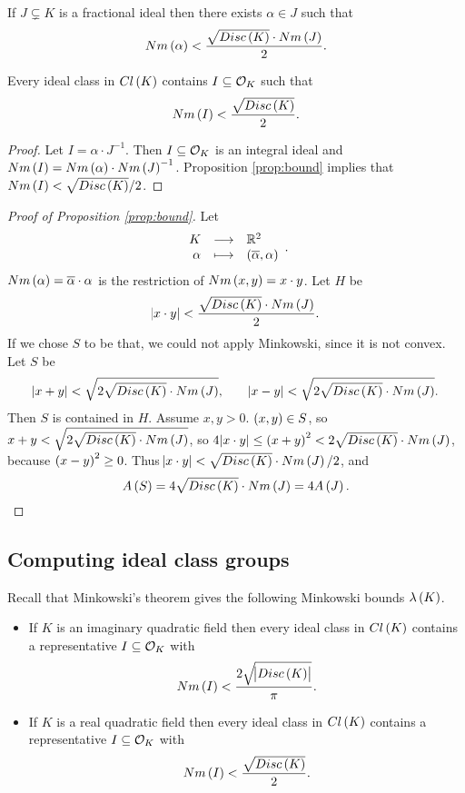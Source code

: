\begin{proposition}
\label{prop:bound}
If $ J \subsetneq K $ is a fractional ideal then there exists $ \alpha \in J $ such that
$$ Nm\br{\alpha} < \dfrac{\sqrt{Disc\br{K}} \cdot Nm\br{J}}{2}. $$
\end{proposition}

\begin{corollary}
Every ideal class in $ Cl\br{K} $ contains $ I \subseteq \mathcal{O}_K $ such that
$$ Nm\br{I} < \dfrac{\sqrt{Disc\br{K}}}{2}. $$
\end{corollary}

\begin{proof}
Let $ I = \alpha \cdot J^{-1} $. Then $ I \subseteq \mathcal{O}_K $ is an integral ideal and $ Nm\br{I} = Nm\br{\alpha} \cdot Nm\br{J}^{-1} $. Proposition \ref{prop:bound} implies that $ Nm\br{I} < \sqrt{Disc\br{K}} / 2 $.
\end{proof}

\begin{proof}[Proof of Proposition \ref{prop:bound}]
Let
$$ \function{K}{\R^2}{\alpha}{\br{\overline{\alpha}, \alpha}}. $$
$ Nm\br{\alpha} = \overline{\alpha} \cdot \alpha $ is the restriction of $ Nm\br{x, y} = x \cdot y $. Let $ H $ be
$$ \abs{x \cdot y} < \dfrac{\sqrt{Disc\br{K}} \cdot Nm\br{J}}{2}. $$
If we chose $ S $ to be that, we could not apply Minkowski, since it is not convex. Let $ S $ be
$$ \abs{x + y} < \sqrt{2\sqrt{Disc\br{K}} \cdot Nm\br{J}}, \qquad \abs{x - y} < \sqrt{2\sqrt{Disc\br{K}} \cdot Nm\br{J}}. $$
Then $ S $ is contained in $ H $. Assume $ x, y > 0 $. $ \br{x, y} \in S $, so $ x + y < \sqrt{2\sqrt{Disc\br{K}} \cdot Nm\br{J}} $, so $ 4\abs{x \cdot y} \le \br{x + y}^2 < 2\sqrt{Disc\br{K}} \cdot Nm\br{J} $, because $ \br{x - y}^2 \ge 0 $. Thus $ \abs{x \cdot y} < \sqrt{Disc\br{K}} \cdot Nm\br{J} / 2 $, and
$$ A\br{S} = 4\sqrt{Disc\br{K}} \cdot Nm\br{J} = 4A\br{J}. $$
\end{proof}

\pagebreak

\subsection{Computing ideal class groups}


Recall that Minkowski's theorem gives the following Minkowski bounds $ \lambda\br{K} $.
\begin{itemize}
\item If $ K $ is an imaginary quadratic field then every ideal class in $ Cl\br{K} $ contains a representative $ I \subseteq \mathcal{O}_K $ with
$$ Nm\br{I} < \dfrac{2\sqrt{\abs{Disc\br{K}}}}{\pi}. $$
\item If $ K $ is a real quadratic field then every ideal class in $ Cl\br{K} $ contains a representative $ I \subseteq \mathcal{O}_K $ with
$$ Nm\br{I} < \dfrac{\sqrt{Disc\br{K}}}{2}. $$
\end{itemize}

